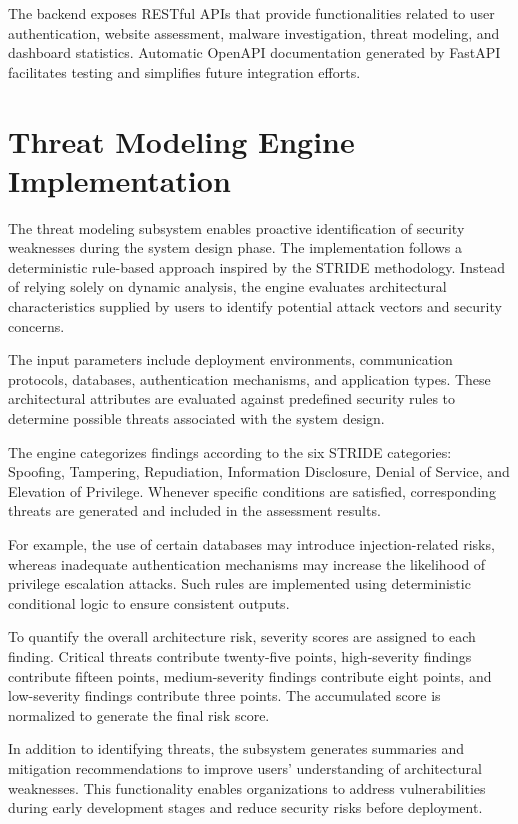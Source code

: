 The backend exposes RESTful APIs that provide functionalities related to user authentication, website assessment, malware investigation, threat modeling, and dashboard statistics. Automatic OpenAPI documentation generated by FastAPI facilitates testing and simplifies future integration efforts.

\section{Threat Modeling Engine Implementation}
The threat modeling subsystem enables proactive identification of security weaknesses during the system design phase. The implementation follows a deterministic rule-based approach inspired by the STRIDE methodology. Instead of relying solely on dynamic analysis, the engine evaluates architectural characteristics supplied by users to identify potential attack vectors and security concerns.

The input parameters include deployment environments, communication protocols, databases, authentication mechanisms, and application types. These architectural attributes are evaluated against predefined security rules to determine possible threats associated with the system design.

The engine categorizes findings according to the six STRIDE categories: Spoofing, Tampering, Repudiation, Information Disclosure, Denial of Service, and Elevation of Privilege. Whenever specific conditions are satisfied, corresponding threats are generated and included in the assessment results.

For example, the use of certain databases may introduce injection-related risks, whereas inadequate authentication mechanisms may increase the likelihood of privilege escalation attacks. Such rules are implemented using deterministic conditional logic to ensure consistent outputs.

To quantify the overall architecture risk, severity scores are assigned to each finding. Critical threats contribute twenty-five points, high-severity findings contribute fifteen points, medium-severity findings contribute eight points, and low-severity findings contribute three points. The accumulated score is normalized to generate the final risk score.

In addition to identifying threats, the subsystem generates summaries and mitigation recommendations to improve users' understanding of architectural weaknesses. This functionality enables organizations to address vulnerabilities during early development stages and reduce security risks before deployment.

